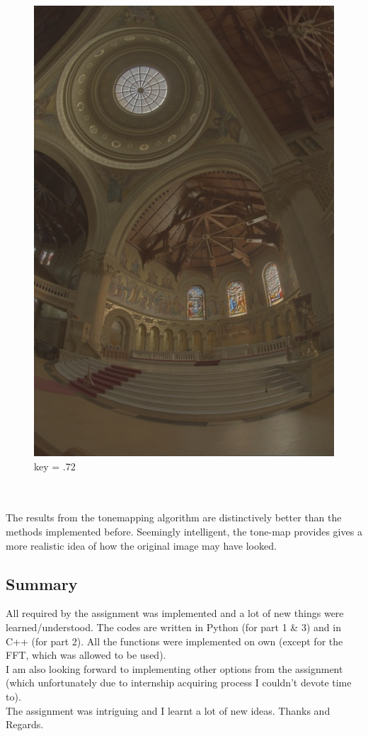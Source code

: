 \documentclass{article}
\begin{document}
\begin{figure}[!htb]
      \includegraphics[scale=.27]{./data/3/avar/7_2.jpg}
      \caption{key = .72}
    \endminipage
    \end{figure}
    \\
    \pagebreak
    \\
    The results from the tonemapping algorithm are distinctively better than the methods implemented before. Seemingly intelligent, the tone-map provides gives a more realistic idea of how the original image may have looked. \\
    \subsection*{Summary}
    All required by the assignment was implemented and a lot of new things were learned/understood. The codes are written in Python (for part 1 \& 3) and in C++ (for part 2). All the functions were implemented on own (except for the FFT, which was allowed to be used). \\
    I am also looking forward to implementing other options from the assignment (which unfortunately due to internship acquiring process I couldn't devote time to).\\
    The assignment was intriguing and I learnt a lot of new ideas. Thanks and Regards.
    
\end{document}
